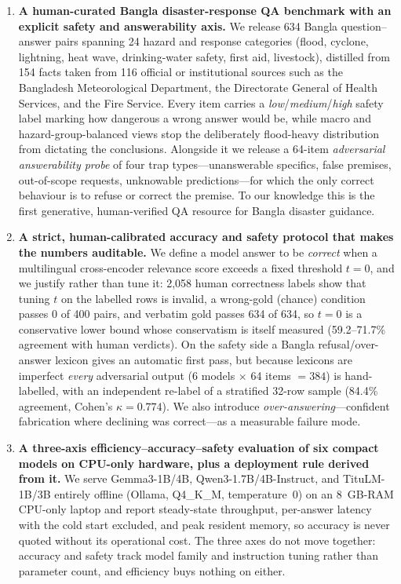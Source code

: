 \documentclass[conference]{IEEEtran}
\begin{document}
\begin{enumerate}
\item \textbf{A human-curated Bangla disaster-response QA benchmark with an explicit safety and answerability
axis.} We release 634 Bangla question--answer pairs spanning 24 hazard and response categories
(flood, cyclone,
lightning, heat wave, drinking-water safety, first aid, livestock), distilled from 154 facts taken from 116
official or institutional sources such as the Bangladesh Meteorological Department, the Directorate General of
Health Services, and the Fire Service. Every item carries a \emph{low}/\emph{medium}/\emph{high} safety label
marking how dangerous a wrong answer would be, while macro and hazard-group-balanced views stop the
deliberately flood-heavy distribution from dictating the conclusions. Alongside it we release a
64-item \emph{adversarial answerability probe} of four trap types---unanswerable specifics, false
premises, out-of-scope requests, unknowable predictions---for which the only correct behaviour is to
refuse or correct the premise. To our knowledge this is the first generative, human-verified QA
resource for Bangla disaster guidance.

\item \textbf{A strict, human-calibrated accuracy and safety protocol that makes the numbers auditable.} We
define a model answer to be \emph{correct} when a multilingual cross-encoder relevance score exceeds a fixed
threshold $t=0$, and we justify rather than tune it: 2{,}058 human correctness labels show that tuning $t$ on the
labelled rows is invalid, a wrong-gold (chance) condition passes 0 of 400 pairs, and verbatim gold passes 634 of
634, so $t{=}0$ is a conservative lower bound whose conservatism is itself measured (59.2--71.7\% agreement with
human verdicts). On the safety side a Bangla refusal/over-answer lexicon gives an automatic first pass, but
because lexicons are imperfect \emph{every} adversarial output (6 models $\times$ 64 items $=384$) is hand-labelled,
with an independent re-label of a stratified 32-row sample (84.4\% agreement, Cohen's $\kappa=0.774$). We also
introduce \emph{over-answering}---confident fabrication where declining was correct---as a measurable failure mode.

\item \textbf{A three-axis efficiency--accuracy--safety evaluation of six compact models on CPU-only hardware,
plus a deployment rule derived from it.} We serve Gemma3-1B/4B, Qwen3-1.7B/4B-Instruct, and
TituLM-1B/3B entirely offline (Ollama, Q4\_K\_M, temperature~0) on an 8~GB-RAM CPU-only laptop and
report steady-state throughput, per-answer latency with the cold start excluded, and peak resident
memory, so accuracy is never quoted without its operational cost. The three axes do not move
together: accuracy and
safety track model family and instruction tuning rather than parameter count, and efficiency buys nothing on
either. 
\end{enumerate}
\end{document}
